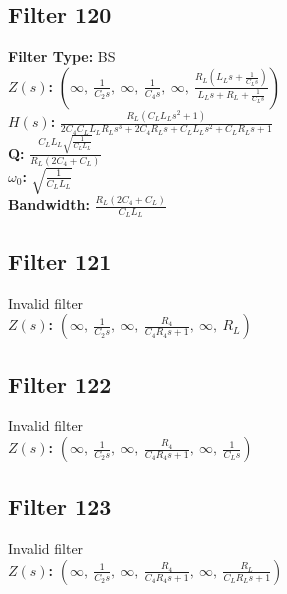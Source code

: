 \documentclass{article}
\begin{document}
\subsection*{Filter 120}
\textbf{Filter Type:} BS \\ 
\textbf{$Z(s)$:} $\left( \infty, \  \frac{1}{C_{2} s}, \  \infty, \  \frac{1}{C_{4} s}, \  \infty, \  \frac{R_{L} \left(L_{L} s + \frac{1}{C_{L} s}\right)}{L_{L} s + R_{L} + \frac{1}{C_{L} s}}\right)$ \\ 
\textbf{$H(s)$:} $\frac{R_{L} \left(C_{L} L_{L} s^{2} + 1\right)}{2 C_{4} C_{L} L_{L} R_{L} s^{3} + 2 C_{4} R_{L} s + C_{L} L_{L} s^{2} + C_{L} R_{L} s + 1}$ \\ 
\textbf{Q:} $\frac{C_{L} L_{L} \sqrt{\frac{1}{C_{L} L_{L}}}}{R_{L} \left(2 C_{4} + C_{L}\right)}$ \\ 
\textbf{$\omega_0$:} $\sqrt{\frac{1}{C_{L} L_{L}}}$ \\ 
\textbf{Bandwidth:} $\frac{R_{L} \left(2 C_{4} + C_{L}\right)}{C_{L} L_{L}}$ \\ 
\subsection*{Filter 121}
Invalid filter \\ 
\textbf{$Z(s)$:} $\left( \infty, \  \frac{1}{C_{2} s}, \  \infty, \  \frac{R_{4}}{C_{4} R_{4} s + 1}, \  \infty, \  R_{L}\right)$ \\ 
\subsection*{Filter 122}
Invalid filter \\ 
\textbf{$Z(s)$:} $\left( \infty, \  \frac{1}{C_{2} s}, \  \infty, \  \frac{R_{4}}{C_{4} R_{4} s + 1}, \  \infty, \  \frac{1}{C_{L} s}\right)$ \\ 
\subsection*{Filter 123}
Invalid filter \\ 
\textbf{$Z(s)$:} $\left( \infty, \  \frac{1}{C_{2} s}, \  \infty, \  \frac{R_{4}}{C_{4} R_{4} s + 1}, \  \infty, \  \frac{R_{L}}{C_{L} R_{L} s + 1}\right)$ \\ 
\end{document}
